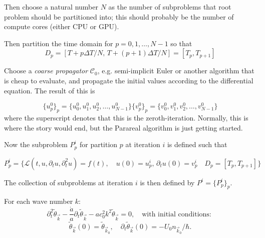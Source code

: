 			Then choose a natural number $N$ as the number of subproblems that root problem should be partitioned into;  this should probably be the number of compute cores (either CPU or GPU).

			Then partition the time domain for $p = 0, 1, \dots, N - 1$ so that 
			\begin{equation}
				D_p = [T + p  \Delta T / N,\, T + (p + 1)  \Delta T / N] = [T_p, T_{p + 1}]
			\end{equation}

\pagebreak

			Choose a \emph{coarse propagator} $\mathcal{C}_0$, e.g. semi-implicit Euler or another algorithm that is cheap to evaluate, and propagate the initial values according to the differential equation.  The result of this is 
			
			\begin{subequations}
			\begin{equation}
				\{u_p^0\}_p = \{u_0^0, u_1^0, u_2^0, \ldots, u_{N-1}^0\}
			\end{equation}
			\begin{equation}
				\{v_p^0\}_p = \{v_0^0, v_1^0, v_2^0, \ldots, v_{N-1}^0\}
			\end{equation}
			\end{subequations}
			where the superscript denotes that this is the zeroth-iteration.  Normally, this is where the story would end, but the Parareal algorithm is just getting started.

			Now the subproblem $P_p^i$ for partition $p$ at iteration $i$ is defined such that 
			
			\begin{equation}
				P_p^i =
				\{\mathcal{L}\left(t, u, \partial_t u, \partial_t^2 u \right) = f(t), \quad
				u(0) = u_p^i,\, \partial_t u(0) = v_p^i \quad 
				D_p = \left[T_p, T_{p+1}\right]\}
			\end{equation}
			
			The collection of subproblems at iteration $i$ is then defined by $P^i = \{P_p^i\}_p$.

For each wave number $k$:
\[
\partial_t^2 \tilde{\theta}_{\vec{k}} - \frac{\dot{a}}{a} \partial_t \tilde{\theta}_{\vec{k}} - a c_0^2 k^2 \tilde{\theta}_{\vec{k}} = 0, \quad \text{with initial conditions: }
\]
\[
\tilde{\theta}_{\vec{k}}(0) = \tilde{\theta}_{\vec{k}_0}, \quad \partial_t \tilde{\theta}_{\vec{k}}(0) = -U_0 n_{\vec{k}_0} / \hbar.
\]

